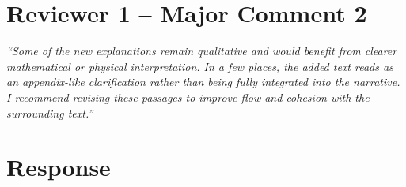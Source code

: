 \documentclass[12pt,a4paper]{article}
\begin{document}
	\section*{Reviewer 1 -- Major Comment 2}
	
	\begin{tcolorbox}[reviewerbox]
		\emph{``Some of the new explanations remain qualitative and would benefit from clearer mathematical or physical interpretation. In a few places, the added text reads as an appendix-like clarification rather than being fully integrated into the narrative. I recommend revising these passages to improve flow and cohesion with the surrounding text.''}
	\end{tcolorbox}
	
	\section*{Response}
	
\end{document}
